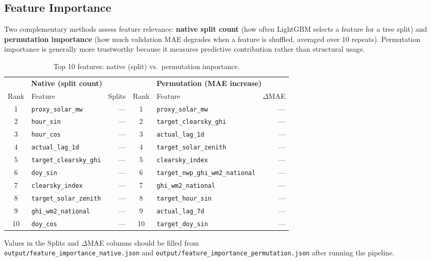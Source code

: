 \documentclass[11pt,a4paper]{article}
\begin{document}
\subsection{Feature Importance}

Two complementary methods assess feature relevance:
\textbf{native split count} (how often LightGBM selects a feature for a tree split) and
\textbf{permutation importance} (how much validation MAE degrades when a feature is shuffled, averaged over 10 repeats).
Permutation importance is generally more trustworthy because it measures predictive contribution rather than structural usage.

\begin{table}[H]
\centering
\caption{Top 10 features: native (split) vs.\ permutation importance.}\label{tab:importance}
\small
\begin{tabular}{@{}clrclr@{}}
\toprule
\multicolumn{3}{c}{\textbf{Native (split count)}} & \multicolumn{3}{c}{\textbf{Permutation (MAE increase)}} \\
\cmidrule(r){1-3} \cmidrule(l){4-6}
Rank & Feature & Splits & Rank & Feature & $\Delta$MAE \\
\midrule
1 & \texttt{proxy\_solar\_mw}   & --- & 1 & \texttt{proxy\_solar\_mw}   & --- \\
2 & \texttt{hour\_sin}          & --- & 2 & \texttt{target\_clearsky\_ghi}     & --- \\
3 & \texttt{hour\_cos}          & --- & 3 & \texttt{actual\_lag\_1d}    & --- \\
4 & \texttt{actual\_lag\_1d}    & --- & 4 & \texttt{target\_solar\_zenith}     & --- \\
5 & \texttt{target\_clearsky\_ghi}     & --- & 5 & \texttt{clearsky\_index}   & --- \\
6 & \texttt{doy\_sin}           & --- & 6 & \texttt{target\_nwp\_ghi\_wm2\_national} & --- \\
7 & \texttt{clearsky\_index}    & --- & 7 & \texttt{ghi\_wm2\_national} & --- \\
8 & \texttt{target\_solar\_zenith}     & --- & 8 & \texttt{target\_hour\_sin}  & --- \\
9 & \texttt{ghi\_wm2\_national} & --- & 9 & \texttt{actual\_lag\_7d}    & --- \\
10 & \texttt{doy\_cos}          & --- & 10 & \texttt{target\_doy\_sin}  & --- \\
\bottomrule
\end{tabular}

\medskip
\footnotesize
Values in the Splits and $\Delta$MAE columns should be filled from\\
\texttt{output/feature\_importance\_native.json} and \texttt{output/feature\_importance\_permutation.json} after running the pipeline.
\end{table}
\end{document}
